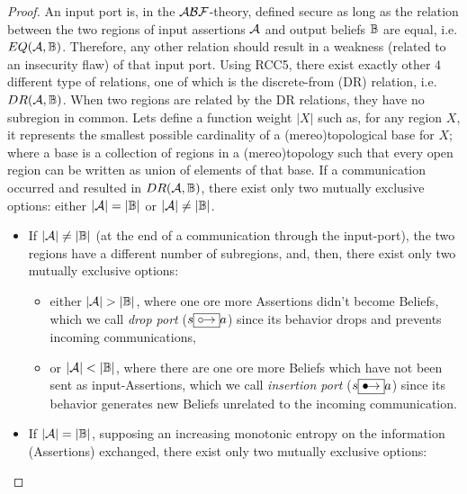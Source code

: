 \begin{proof}
An input port is, in the $\mathcal{A}\mathcal{B}\mathcal{F}$-theory, defined secure as long as the relation
	between the two regions of input assertions $\mathcal{A}$ and
	output beliefs $\mathbb{B}$ are equal, i.e.
	$EQ(\mathcal{A},\mathbb{B})$. Therefore, any other relation
	should result in a weakness (related to an insecurity flaw) of that
	input port.  Using RCC5, there exist exactly other $4$ different type
	of relations, one of which is the discrete-from (DR) relation, i.e.
	$DR(\mathcal{A},\mathbb{B})$. When two regions are related by
	the DR relations, they have no subregion in common. Lets
	define a function weight $|X|$ such as, for any region $X$, it
	represents the smallest possible cardinality of a (mereo)topological base for
	$X$; where a base is a collection of regions in a (mereo)topology such that
	every open region can be written as union of elements of that base.  If
	a communication occurred and resulted in
	$DR(\mathcal{A},\mathbb{B})$, there exist only two mutually
	exclusive options: either $|\mathcal{A}|=|\mathbb{B}|$ or
	$|\mathcal{A}|\neq|\mathbb{B}|$. 
	\begin{itemize}
		\item If $|\mathcal{A}|\neq|\mathbb{B}|$ (at the end of
			a communication through the input-port), the two
			regions have a different number of subregions, and,
			then, there exist only two mutually exclusive options: 
			\begin{itemize}
				\item either $|\assertionRegion|>|\beliefRegion|$, where one
					ore more Assertions didn't become Beliefs, which we
					call \emph{drop port} ($s\fbox{\ensuremath {\mathrel{\circ\!\!\rightarrow}}} a$) since its behavior drops and
					prevents incoming communications,
				\item or $|\assertionRegion|<|\beliefRegion|$, where there are
					one ore more Beliefs which have not been sent as
					input-Assertions, which we call \emph{insertion
					port} ($s\fbox{\ensuremath {\mathrel{\bullet\!\!\rightarrow}}} a$) since its behavior generates new Beliefs
					unrelated to the incoming communication. 
			\end{itemize}
		\item If $|\mathcal{A}|=|\mathbb{B}|$, supposing an increasing monotonic entropy on the information (Assertions) exchanged, 
				there exist only two mutually exclusive options: 
			\begin{itemize}

\end{itemize}
\end{itemize}
\end{proof}
